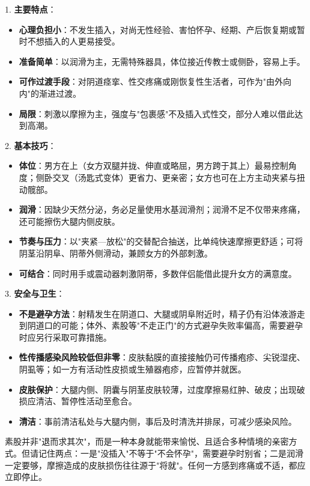 \documentclass[12pt,UTF8]{ctexbook}
\begin{document}
1. \textbf{主要特点}：
\begin{itemize}
	\item \textbf{心理负担小}：不发生插入，对尚无性经验、害怕怀孕、经期、产后恢复期或暂时不想插入的人更易接受。
	\item \textbf{准备简单}：以润滑为主，无需特殊器具，体位接近传教士或侧卧，容易上手。
	\item \textbf{可作过渡手段}：对阴道痉挛、性交疼痛或刚恢复性生活者，可作为"由外向内"的渐进过渡。
	\item \textbf{局限}：刺激以摩擦为主，强度与"包裹感"不及插入式性交，部分人难以借此达到高潮。
\end{itemize}

2. \textbf{基本技巧}：
\begin{itemize}
	\item \textbf{体位}：男方在上（女方双腿并拢、伸直或略屈，男方跨于其上）最易控制角度；侧卧交叉（汤匙式变体）更省力、更亲密；女方也可在上方主动夹紧与扭动髋部。
	\item \textbf{润滑}：因缺少天然分泌，务必足量使用水基润滑剂；润滑不足不仅带来疼痛，还可能擦伤大腿内侧皮肤。
	\item \textbf{节奏与压力}：以"夹紧—放松"的交替配合抽送，比单纯快速摩擦更舒适；可将阴茎沿阴阜、阴蒂外侧滑动，兼顾女方的外部刺激。
	\item \textbf{可结合}：同时用手或震动器刺激阴蒂，多数伴侣能借此提升女方的满意度。
\end{itemize}

3. \textbf{安全与卫生}：
\begin{itemize}
	\item \textbf{不是避孕方法}：射精发生在阴道口、大腿或阴阜附近时，精子仍有沿体液游走到阴道口的可能；体外、素股等"不走正门"的方式避孕失败率偏高，需要避孕时应另行采取可靠措施。
	\item \textbf{性传播感染风险较低但非零}：皮肤黏膜的直接接触仍可传播疱疹、尖锐湿疣、阴虱等；如一方有活动性皮损或生殖器疱疹，应暂停并就医。
	\item \textbf{皮肤保护}：大腿内侧、阴囊与阴茎皮肤较薄，过度摩擦易红肿、破皮；出现破损应清洁、暂停性活动至愈合。
	\item \textbf{清洁}：事前清洁私处与大腿内侧，事后及时清洗并排尿，可减少感染风险。
\end{itemize}

\begin{tcolorbox}[colback=pink!5!white,colframe=red!50!black,title=贴心小叮咛]
	素股并非"退而求其次"，而是一种本身就能带来愉悦、且适合多种情境的亲密方式。但请记住两点：一是"没插入"不等于"不会怀孕"，需要避孕时别省；二是润滑一定要够，摩擦造成的皮肤损伤往往源于"将就"。任何一方感到疼痛或不适，都应立即停止。
\end{tcolorbox}
\end{document}
